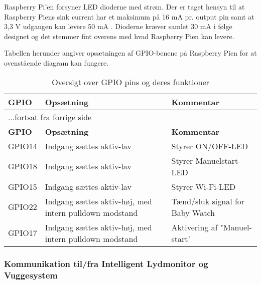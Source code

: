 
Raspberry Pi'en forsyner LED dioderne med strøm. Der er taget hensyn til at Raspberry Piens sink current har et maksimum på 16 mA pr. output pin samt at 3,3 V udgangen kan levere 50 mA \citep{website:raspi-power}. Dioderne kræver samlet 30 mA i følge designet og det stemmer fint overens med hvad Raspberry Pien kan levere. 

Tabellen herunder angiver opsætningen af GPIO-benene på Raspberry Pien for at ovenstående diagram kan fungere.

\begin{center}
\label{ctrl:raspberry_pi_setup}
\begin{longtable}{|p{3cm}|p{4cm}|p{4cm}|}
\caption{Oversigt over GPIO pins og deres funktioner}\\
\hline
\textbf{GPIO}	&\textbf{Opsætning} 		&\textbf{Kommentar} 	\\ \hline
\endfirsthead
\multicolumn{3}{l}{...fortsat fra forrige side} \\ \hline 
\textbf{GPIO}	&\textbf{Opsætning} 		&\textbf{Kommentar}  \\ \hline
\endhead



GPIO14
&Indgang sættes aktiv-lav
&Styrer ON/OFF-LED

\\\hline

GPIO18
&Indgang sættes aktiv-lav
&Styrer Manuelstart-LED

\\\hline


GPIO15
&Indgang sættes aktiv-lav
&Styrer Wi-Fi-LED

\\\hline

GPIO22
&Indgang sættes aktiv-høj, med intern pulldown modstand
&Tænd/sluk signal for Baby Watch

\\\hline

GPIO17
&Indgang sættes aktiv-høj, med intern pulldown modstand
&Aktivering af "Manuel-start"
\\\hline

\end{longtable}
\end{center}

\subsubsection*{Kommunikation til/fra Intelligent Lydmonitor og Vuggesystem}

